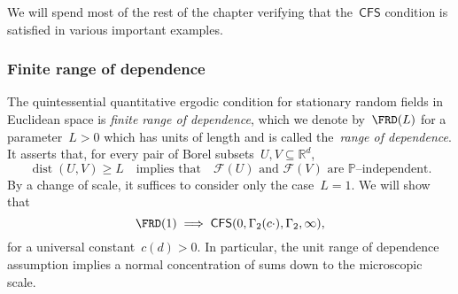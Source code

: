 \documentclass[11pt,twoside]{article} %
\numberwithin{equation}{section}
\theoremstyle{definition}
\newcommand*{\Rd}{\ensuremath{\mathbb{R}^d}}
\newcommand{\F}{\mathcal{F}}
\renewcommand{\P}{\mathbb{P}}
\DeclareMathOperator{\dist}{dist}
\newcommand{\CFS}{\mathsf{CFS}}
\begin{document}
\label{ss.examples}

We will spend most of the rest of the chapter verifying that the~$\CFS$ condition is satisfied in various important examples.

\subsubsection{Finite range of  dependence}
\label{ss.FRD}
The quintessential quantitative ergodic condition for stationary random fields in Euclidean space is \emph{finite range of dependence}, which we denote by~$\FRD(L)$ for a parameter~$L>0$ which has units of length and is called the~\emph{range of dependence}. It asserts that, for every pair of Borel subsets~$U,V\subseteq\Rd$,
\begin{equation} 
\label{e.unitrange}
\dist(U,V) \geq L
\quad\mbox{implies that} \quad 
\mbox{$\F(U)$ and~$\F(V)$ are~$\P$--independent.}
\end{equation}
By a change of scale, it suffices to consider only the case~$L=1$. We will show that 
\begin{equation}
\label{e.URDyes}
\FRD(1) \implies \CFS(0,\Gamma_2(c\cdot),\Gamma_2,\infty),
\end{equation}
for a universal constant~$c(d)>0$. In particular, the unit range of dependence assumption implies a normal concentration of sums down to the microscopic scale.

\smallskip
\end{document}
